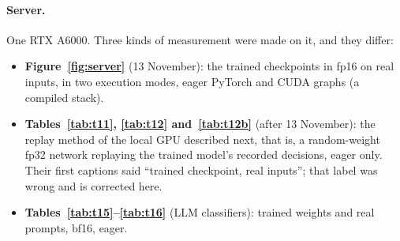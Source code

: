 \begin{table}[ht]
  \centering\small
  \caption{Models and tasks. Encoder backbones were fine-tuned jointly with their six exits (training details in
  Step~R\ref{st:train}). The decoders' exits were trained on a frozen backbone (13 November) and then with LoRA
  (Section~\ref{sec:llm}). The LLM classifiers train LoRA adapters (rank 16, $\alpha=32$) and one head per exit
  on the last prompt token (Step~R\ref{st:llm}); their accuracies are MNLI, QQP on the whole validation set.}
  \label{tab:models}
\end{table}

\paragraph{Server.} One RTX A6000. Three kinds of measurement were made on it, and they differ:
\begin{itemize}
  \item \textbf{Figure~\ref{fig:server}} (13 November): the trained checkpoints in fp16 on real inputs, in two
  execution modes, eager PyTorch and CUDA graphs (a compiled stack).
  \item \textbf{Tables~\ref{tab:t11}, \ref{tab:t12} and~\ref{tab:t12b}} (after 13 November): the replay method of
  the local GPU described next, that is, a random-weight fp32 network replaying the trained model's recorded
  decisions, eager only. Their first captions said ``trained checkpoint, real inputs''; that label was wrong and is
  corrected here.
  \item \textbf{Tables~\ref{tab:t15}--\ref{tab:t16}} (LLM classifiers): trained weights and real prompts, bf16,
  eager.
\end{itemize}

